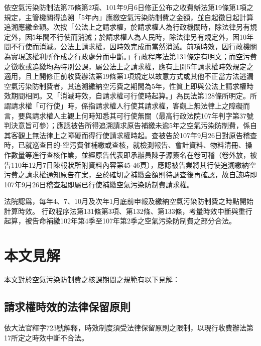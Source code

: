 \documentclass[11pt,a4paper]{article}
\begin{document}
依空氣污染防制法第75條第2項、101年9月6日修正公布之收費辦法第19條第1項之規定，主管機關得追溯「5年內」應繳空氣污染防制費之金額，並自起徵日起計算追溯應繳金額。次按「公法上之請求權，於請求權人為行政機關時，除法律另有規定外，因5年間不行使而消滅；於請求權人為人民時，除法律另有規定外，因10年間不行使而消滅。公法上請求權，因時效完成而當然消滅。前項時效，因行政機關為實現該權利所作成之行政處分而中斷。」行政程序法第131條定有明文；而空污費之徵收或追繳均為特別公課，屬公法上之請求權，應有上開5年請求權時效規定之適用，且上開修正前收費辦法第19條第1項規定以故意方式或其他不正當方法逃漏空氣污染防制費者，其追溯繳納空污費之期間為5年，性質上即與公法上請求權時效期間相同。又「消滅時效，自請求權可行使時起算。」為民法第128條所明定。所謂請求權「可行使」時，係指請求權人行使其請求權，客觀上無法律上之障礙而言，要與請求權人主觀上何時知悉其可行使無關（最高行政法院107年判字第37號判決意旨可參）；應認被告所得追溯請求原告補繳未逾5年之空氣污染防制費，係自其客觀上無法律上之障礙而得行使請求權時起。查被告於107年9月26日對原告稽查時，已就巡查目的-空污費催補繳或查核，就檢測報告、會計資料、物料清冊、操作數量等進行查核作業，並經原告代表即承辦員陳子源簽名在卷可稽（卷外放，被告110年12月7日陳報狀所附資料內容第45-46頁），應認被告業將其行使追溯繳納空污費之請求權通知原告在案，至於確切之補繳金額則待調查後再確認，故自該時即107年9月26日稽查起即屬已行使補繳空氣污染防制費請求權。

法院認爲，每年4、7、10月及次年1月底前申報及繳納空氣污染防制費之時點開始計算時效。
行政程序法第131條第3項、第132條、第133條，考量時效中斷與重行起算，被告命補繳102年第4季至107年第2季之空氣污染防制費之部分合法。





\section{本文見解}


本文對於空氣污染防制費之核課期間之規範有以下見解：

\subsection{請求權時效的法律保留原則}
依大法官釋字723號解釋，時效制度須受法律保留原則之限制，以現行收費辦法第17所定之時效中斷不合法。
\end{document}
